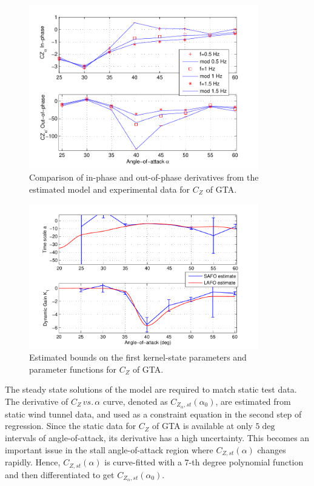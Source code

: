 \documentclass{AIAA}
\begin{document}
\begin{figure}
\centering
\includegraphics[width=100mm]{GTA_Cz_SA}
\caption{Comparison of in-phase and out-of-phase derivatives from the estimated model and experimental data for $C_Z$ of GTA.}
\label{fig:GTA_Cz_res}
\end{figure}
\begin{figure}
\centering
\includegraphics[width=100mm]{GTA_Cz_Par}
\caption{Estimated bounds on the first kernel-state parameters and parameter functions for $C_Z$ of GTA.}
\label{fig:GTA_Cz_Par}
\end{figure}

The steady state solutions of the model are required to match static test data. The derivative of $C_Z \, vs. \, \alpha$ curve, denoted as $C_{Z_\alpha,st}(\alpha_0)$, are estimated from static wind tunnel data, and used as a constraint equation in the second step of regression. Since the static data for $C_Z$ of GTA is available at only $5 \deg$ intervals of angle-of-attack, its derivative has a high uncertainty. This becomes an important issue in the stall angle-of-attack region where $C_{Z,st}(\alpha)$ changes rapidly. Hence, $C_{Z,st}(\alpha)$ is curve-fitted with a $7$-th degree polynomial function and then differentiated to get $C_{Z_\alpha,st}(\alpha_0)$. 
\end{document}

